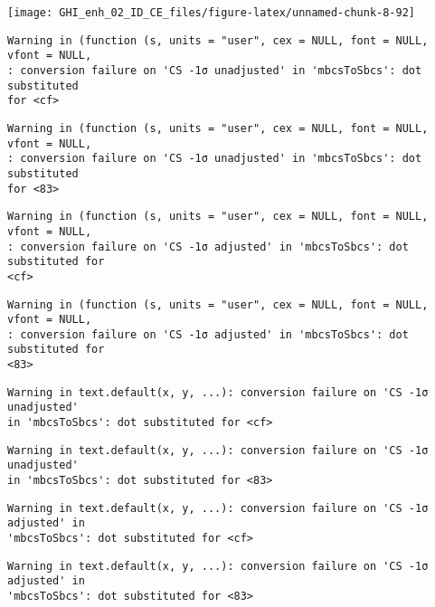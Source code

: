 \documentclass[
  10pt,
  a4paper,oneside]{article}
\begin{document}
\begin{center}\texttt{[image: GHI\_enh\_02\_ID\_CE\_files/figure-latex/unnamed-chunk-8-92]} \end{center}

\begin{verbatim}
Warning in (function (s, units = "user", cex = NULL, font = NULL, vfont = NULL,
: conversion failure on 'CS -1σ unadjusted' in 'mbcsToSbcs': dot substituted
for <cf>
\end{verbatim}

\begin{verbatim}
Warning in (function (s, units = "user", cex = NULL, font = NULL, vfont = NULL,
: conversion failure on 'CS -1σ unadjusted' in 'mbcsToSbcs': dot substituted
for <83>
\end{verbatim}

\begin{verbatim}
Warning in (function (s, units = "user", cex = NULL, font = NULL, vfont = NULL,
: conversion failure on 'CS -1σ adjusted' in 'mbcsToSbcs': dot substituted for
<cf>
\end{verbatim}

\begin{verbatim}
Warning in (function (s, units = "user", cex = NULL, font = NULL, vfont = NULL,
: conversion failure on 'CS -1σ adjusted' in 'mbcsToSbcs': dot substituted for
<83>
\end{verbatim}

\begin{verbatim}
Warning in text.default(x, y, ...): conversion failure on 'CS -1σ unadjusted'
in 'mbcsToSbcs': dot substituted for <cf>
\end{verbatim}

\begin{verbatim}
Warning in text.default(x, y, ...): conversion failure on 'CS -1σ unadjusted'
in 'mbcsToSbcs': dot substituted for <83>
\end{verbatim}

\begin{verbatim}
Warning in text.default(x, y, ...): conversion failure on 'CS -1σ adjusted' in
'mbcsToSbcs': dot substituted for <cf>
\end{verbatim}

\begin{verbatim}
Warning in text.default(x, y, ...): conversion failure on 'CS -1σ adjusted' in
'mbcsToSbcs': dot substituted for <83>
\end{verbatim}
\end{document}

